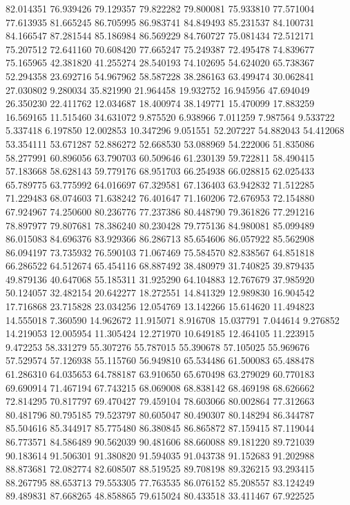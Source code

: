 82.014351
76.939426
79.129357
79.822282
79.800081
75.933810
77.571004
77.613935
81.665245
86.705995
86.983741
84.849493
85.231537
84.100731
84.166547
87.281544
85.186984
86.569229
84.760727
75.081434
72.512171
75.207512
72.641160
70.608420
77.665247
75.249387
72.495478
74.839677
75.165965
42.381820
41.255274
28.540193
74.102695
54.624020
65.738367
52.294358
23.692716
54.967962
58.587228
38.286163
63.499474
30.062841
27.030802
9.280034
35.821990
21.964458
19.932752
16.945956
47.694049
26.350230
22.411762
12.034687
18.400974
38.149771
15.470099
17.883259
16.569165
11.515460
34.631072
9.875520
6.938966
7.011259
7.987564
9.533722
5.337418
6.197850
12.002853
10.347296
9.051551
52.207227
54.882043
54.412068
53.354111
53.671287
52.886272
52.668530
53.088969
54.222006
51.835086
58.277991
60.896056
63.790703
60.509646
61.230139
59.722811
58.490415
57.183668
58.628143
59.779176
68.951703
66.254938
66.028815
62.025433
65.789775
63.775992
64.016697
67.329581
67.136403
63.942832
71.512285
71.229483
68.074603
71.638242
76.401647
71.160206
72.676953
72.154880
67.924967
74.250600
80.236776
77.237386
80.448790
79.361826
77.291216
78.897977
79.807681
78.386240
80.230428
79.775136
84.980081
85.099489
86.015083
84.696376
83.929366
86.286713
85.654606
86.057922
85.562908
86.094197
73.735932
76.590103
71.067469
75.584570
82.838567
64.851818
66.286522
64.512674
65.454116
68.887492
38.480979
31.740825
39.879435
49.879136
40.647068
55.185311
31.925290
64.104883
12.767679
37.985920
50.124057
32.482154
20.642277
18.272551
14.841329
12.989830
16.904542
17.716868
23.715828
23.034256
12.054769
13.142266
15.614620
11.494823
14.555018
7.360590
14.962672
11.915071
8.916708
15.037791
7.044614
9.276852
14.219053
12.005954
11.305424
12.271970
10.649185
12.464105
11.223915
9.472253
58.331279
55.307276
55.787015
55.390678
57.105025
55.969676
57.529574
57.126938
55.115760
56.949810
65.534486
61.500083
65.488478
61.286310
64.035653
64.788187
63.910650
65.670498
63.279029
60.770183
69.690914
71.467194
67.743215
68.069008
68.838142
68.469198
68.626662
72.814295
70.817797
69.470427
79.459104
78.603066
80.002864
77.312663
80.481796
80.795185
79.523797
80.605047
80.490307
80.148294
86.344787
85.504616
85.344917
85.775480
86.380845
86.865872
87.159415
87.119044
86.773571
84.586489
90.562039
90.481606
88.660088
89.181220
89.721039
90.183614
91.506301
91.380820
91.594035
91.043738
91.152683
91.202988
88.873681
72.082774
82.608507
88.519525
89.708198
89.326215
93.293415
88.267795
88.653713
79.553305
77.763535
86.076152
85.208557
83.124249
89.489831
87.668265
48.858865
79.615024
80.433518
33.411467
67.922525
